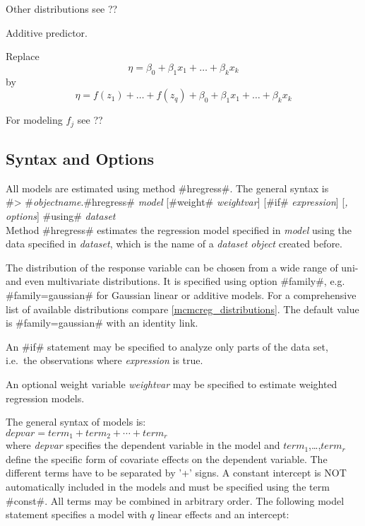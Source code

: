 Other distributions see ??

Additive predictor. 

Replace 
$$
\eta = \beta_0 + \beta_1 x_1 + \ldots + \beta_k x_k
$$
by
$$
\eta = f(z_{1}) + \ldots + f(z_{q}) + \beta_0 + \beta_1 x_{1} + \ldots + \beta_k x_{k}
$$

For modeling $f_j$ see ??

\subsection{Syntax and Options}

All models are estimated using method #hregress#. The general syntax is \\

#> #{\em objectname}.#hregress# {\em model} [#weight# {\em weightvar}] [#if# {\em expression}] [{\em , options}] #using# {\em dataset} \\

Method #hregress# estimates the regression model specified in {\em
model} using the data specified in {\em dataset}, which is 
the name of a {\em dataset object} created before. 

The distribution of the response variable can be chosen from a wide
range of uni- and even multivariate distributions. It is
specified using option
#family#, e.g. #family=gaussian# for Gaussian linear or additive models. 
For a comprehensive list of available distributions compare \autoref{mcmcreg_distributions}.
The default value is #family=gaussian#
with an identity link.  

An #if# statement may be specified to analyze
only parts of the data set, i.e.~the observations where {\em
expression} is true.

An optional weight variable {\em weightvar} may be specified to
estimate weighted regression models.


The general syntax of models is: \\

$depvar = term_1 + term_2 + \cdots + term_r$ \\

where {\em depvar} specifies the dependent variable in the model
and $term_1$,\dots,$term_r$ define the specific form of covariate
effects on the dependent variable. The different terms have to be
separated by '+' signs. A constant intercept is NOT automatically
included in the models and must be specified using the term #const#. 
All terms may be combined
in arbitrary order. 
The following model statement specifies a model with $q$ linear effects and an intercept: \\

